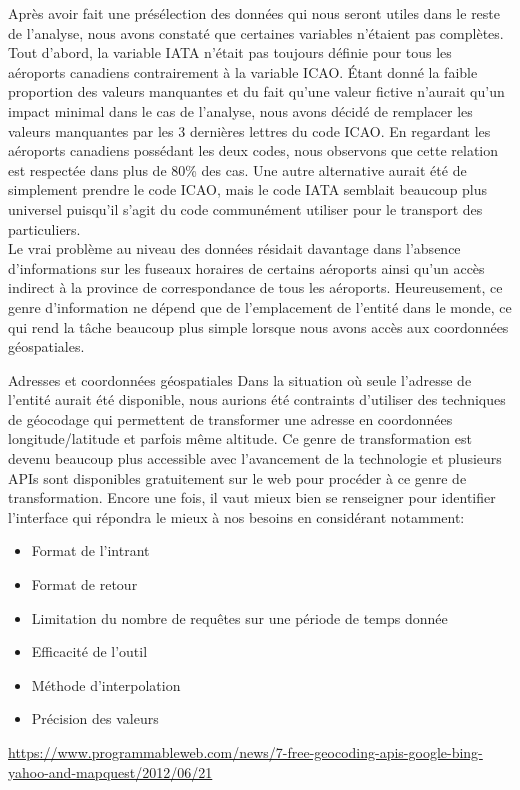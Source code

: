 Après avoir fait une présélection des données qui nous seront utiles dans le reste de l'analyse, nous avons constaté que certaines variables n'étaient pas complètes. Tout d'abord, la variable IATA n'était pas toujours définie pour tous les aéroports canadiens contrairement à la variable ICAO. Étant donné la faible proportion des valeurs manquantes et du fait qu'une valeur fictive n'aurait qu'un impact minimal dans le cas de l'analyse, nous avons décidé de remplacer les valeurs manquantes par les 3 dernières lettres du code ICAO. En regardant les aéroports canadiens possédant les deux codes, nous observons que cette relation est respectée dans plus de 80\% des cas. Une autre alternative aurait été de simplement prendre le code ICAO, mais le code IATA semblait beaucoup plus universel puisqu'il s'agit du code communément utiliser pour le transport des particuliers. \\

Le vrai problème au niveau des données résidait davantage dans l'absence d'informations sur les fuseaux horaires de certains aéroports ainsi qu'un accès indirect à la province de correspondance de tous les aéroports. Heureusement, ce genre d'information ne dépend que de l'emplacement de l'entité dans le monde, ce qui rend la tâche beaucoup plus simple lorsque nous avons accès aux coordonnées géospatiales. \\

\begin{moreInfo}{Adresses et coordonnées géospatiales}
	Dans la situation où seule l'adresse de l'entité aurait été disponible, nous aurions été contraints d'utiliser des techniques de géocodage qui permettent de transformer une adresse en coordonnées longitude/latitude et parfois même altitude. Ce genre de transformation est devenu beaucoup plus accessible avec l'avancement de la technologie et plusieurs APIs sont disponibles gratuitement sur le web pour procéder à ce genre de transformation. Encore une fois, il vaut mieux bien se renseigner pour identifier l'interface qui répondra le mieux à nos besoins en considérant notamment:
	\begin{itemize}
		\item Format de l'intrant
		\item Format de retour
		\item Limitation du nombre de requêtes sur une période de temps donnée
		\item Efficacité de l'outil
		\item Méthode d'interpolation
		\item Précision des valeurs
	\end{itemize}
	\url{https://www.programmableweb.com/news/7-free-geocoding-apis-google-bing-yahoo-and-mapquest/2012/06/21}
\end{moreInfo}

